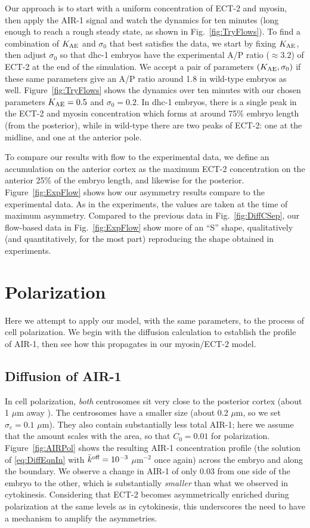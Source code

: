 \documentclass[11pt]{article}
\begin{document}
Our approach is to start with a uniform concentration of ECT-2 and myosin, then apply the AIR-1 signal and watch the dynamics for ten minutes (long enough to reach a rough steady state, as shown in Fig.\ \ref{fig:TryFlows}). To find a combination of $K_\text{AE}$ and $\sigma_0$ that best satisfies the data, we start by fixing $K_\text{AE}$, then adjust $\sigma_0$ so that dhc-1 embryos have the experimental A/P ratio ($\approx 3.2$) of ECT-2 at the end of the simulation. We accept a pair of parameters $\left(K_\text{AE},\sigma_0\right)$ if these same parameters give an A/P ratio around 1.8 in wild-type embryos as well. Figure\ \ref{fig:TryFlows} shows the dynamics over ten minutes with our chosen parameters $K_\text{AE}=0.5$ and $\sigma_0=0.2$. In dhc-1 embryos, there is a single peak in the ECT-2 and myosin concentration which forms at around 75\% embryo length (from the posterior), while in wild-type there are two peaks of ECT-2: one at the midline, and one at the anterior pole. 

To compare our results with flow to the experimental data, we define an accumulation on the anterior cortex as the maximum ECT-2 concentration on the anterior 25\% of the embryo length, and likewise for the posterior. Figure\ \ref{fig:ExpFlow} shows how our asymmetry results compare to the experimental data. As in the experiments, the values are taken at the time of maximum asymmetry. Compared to the previous data in Fig.\ \ref{fig:DiffCSep}, our flow-based data in Fig.\ \ref{fig:ExpFlow} show more of an ``S'' shape, qualitatively (and quantitatively, for the most part) reproducing the shape obtained in experiments.

\section{Polarization}
Here we attempt to apply our model, with the same parameters, to the process of cell polarization. We begin with the diffusion calculation to establish the profile of AIR-1, then see how this propagates in our myosin/ECT-2 model.

\subsection{Diffusion of AIR-1 \label{sec:airpol}}
In cell polarization, \emph{both} centrosomes sit very close to the posterior cortex (about 1 $\mu$m away \cite{cowan2004centrosomes}). The centrosomes have a smaller size (about 0.2 $\mu$m, so we set $\sigma_c=0.1$ $\mu$m). They also contain substantially less total AIR-1; here we assume that the amount scales with the area, so that $C_0=0.01$ for polarization. Figure\ \ref{fig:AIRPol} shows the resulting AIR-1 concentration profile (the solution of \eqref{eq:DiffEqnIn} with $\bar{k}^\text{off}=10^{-3}$ $\mu$m$^{-2}$ once again) across the embryo and along the boundary. We observe a change in AIR-1 of only 0.03 from one side of the embryo to the other, which is substantially \emph{smaller} than what we observed in cytokinesis. Considering that ECT-2 becomes asymmetrically enriched during polarization at the same levels as in cytokinesis, this underscores the need to have a mechanism to amplify the asymmetries. 
\end{document}
